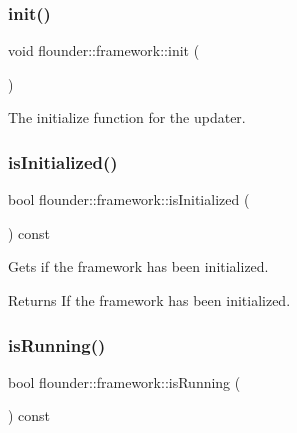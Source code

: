 \subsubsection{\texorpdfstring{init()}{init()}}
{\footnotesize\ttfamily void flounder\+::framework\+::init (\begin{DoxyParamCaption}{ }\end{DoxyParamCaption})}



The initialize function for the updater. 

\mbox{\label{classflounder_1_1framework_ad217b91b7e0f46f305105045396dcdf3}} 
\subsubsection{\texorpdfstring{is\+Initialized()}{isInitialized()}}
{\footnotesize\ttfamily bool flounder\+::framework\+::is\+Initialized (\begin{DoxyParamCaption}{ }\end{DoxyParamCaption}) const\hspace{0.3cm}{\ttfamily [inline]}}



Gets if the framework has been initialized. 

\begin{DoxyReturn}{Returns}
If the framework has been initialized. 
\end{DoxyReturn}
\mbox{\label{classflounder_1_1framework_a7e2584d7a3443c07b1d5eac2f44da14f}} 
\subsubsection{\texorpdfstring{is\+Running()}{isRunning()}}
{\footnotesize\ttfamily bool flounder\+::framework\+::is\+Running (\begin{DoxyParamCaption}{ }\end{DoxyParamCaption}) const\hspace{0.3cm}{\ttfamily [inline]}}



